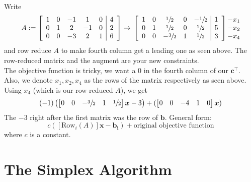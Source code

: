 \begin{exbox}
    \begin{example}
        Write
        \[A:=
            \left[\begin{array}{ccccc|c}
                    1 & 0 & -1 & 1  & 0 & 4 \\
                    0 & 1 & 2  & -1 & 0 & 2 \\
                    0 & 0 & -3 & 2  & 1 & 6
                \end{array}\right]
            \rightarrow{}
            \left[\begin{array}{ccccc|c}
                    1 & 0 & \sfrac{1}{2}  & 0 & -\sfrac{1}{2} & 1 \\
                    0 & 1 & \sfrac{1}{2}  & 0 & \sfrac{1}{2}  & 5 \\
                    0 & 0 & -\sfrac{3}{2} & 1 & \sfrac{1}{2}  & 3
                \end{array}\right]
            \begin{matrix}
                -x_1 \\
                -x_2 \\
                -x_4
            \end{matrix}
        \]
        and row reduce $A$ to make fourth column get a leading one as seen above.
        The row-reduced matrix and the augment are your new constraints.\\
        The objective function is tricky, we want a 0 in the fourth column of our $\bm{c}^\top $.
        Also, we denote $x_1,x_2,x_4$ as the rows of the matrix respectively as seen above.
        Using $x_4$ (which is our row-reduced $A$), we get
        \[(-1)\left(
            \begin{bmatrix}
                0 & 0 & -\sfrac{3}{2} & 1 & \sfrac{1}{2}
            \end{bmatrix}\bm{x}-3\right)+
            (\begin{bmatrix}
                0 & 0 & -4 & 1 & 0
            \end{bmatrix}\bm{x})
        \]
        The $-3$ right after the first matrix was the row of $\bm{b}$. General form:
        \[ c([\text{Row}_i(A)]\bm{x}-\bm{b_i})+\text{original objective function} \]
        where $ c $ is a constant.
    \end{example}
\end{exbox}

\section{The Simplex Algorithm}

